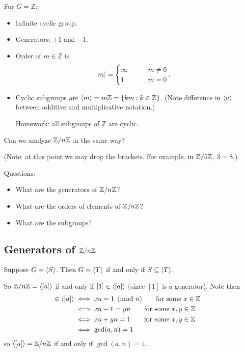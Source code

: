 \documentclass[12pt,letterpaper]{report}
\begin{document}
\begin{ex}
  For $G = \mathbb{Z}$:
  \begin{itemize}
    \item Infinite cyclic group.
    \item Generators: $+1$ and $-1$.
    \item Order of $m \in \mathbb{Z}$ is
    \[ \lvert m\rvert = \begin{cases}
      \infty \qquad & m \neq 0 \\
      1 & m = 0
    \end{cases}. \]
    \item Cyclic subgroups are $\langle m\rangle = m\mathbb{Z} = \{ km : k \in \mathbb{Z} \}$.
    (Note difference in $\langle a\rangle$ between additive and multiplicative notation.)

    Homework: all subgroups of $\mathbb{Z}$ are cyclic.
  \end{itemize}
\end{ex}

\begin{ex}
  Can we analyze $\mathbb{Z}/{n}\mathbb{Z}$ in the same way?

  (Note: at this point we may drop the brackets. For example, in $\mathbb{Z}/{5}\mathbb{Z}$, $3 = 8$.)

  Questions:
  \begin{itemize}
    \item What are the generators of $\mathbb{Z}/{n}\mathbb{Z}$?
    \item What are the orders of elements of $\mathbb{Z}/{n}\mathbb{Z}$?
    \item What are the subgroups?
  \end{itemize}
\end{ex}

\pagebreak
\subsection[Generators of Z/nZ]{Generators of $\mathbb{Z}/{n}\mathbb{Z}$}

\begin{lem}{}{}
  Suppose $G = \langle S\rangle$.
  Then $G = \langle T\rangle$ if and only if $S \subseteq \langle T\rangle$.
\end{lem}

So $\mathbb{Z}/{n}\mathbb{Z} = \langle[a]\rangle$ if and only if $[1] \in \langle[a]\rangle$ (since $[1]$ is a
generator).
Note then
\begin{align*}
  [1] \in \ang{[a]} &\iff xa = 1 \pmod{n} \qquad \text{for some } x \in \mathbb{Z} \\
  &\iff xa - 1 = yn \qquad \text{for some } x, y \in \mathbb{Z} \\
  &\iff xa + yn = 1 \qquad \text{for some } x, y \in \mathbb{Z} \\
  &\iff \gcd(a, n) = 1
\end{align*}
so $\langle[a]\rangle = \mathbb{Z}/{n}\mathbb{Z}$ if and only if $\gcd(a, n) = 1$.
\end{document}
